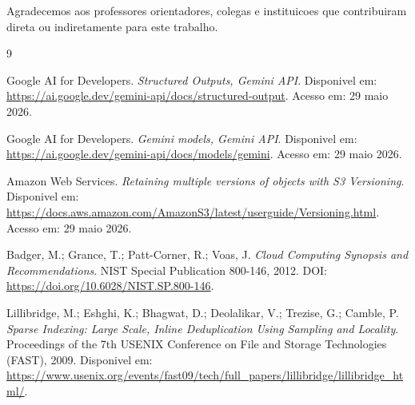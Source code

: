 \documentclass[12pt,a4paper]{article}
\begin{document}
Agradecemos aos professores orientadores, colegas e instituicoes que contribuiram direta ou indiretamente para este trabalho.

\begin{thebibliography}{9}

Google AI for Developers.
\textit{Structured Outputs, Gemini API}.
Disponivel em: \url{https://ai.google.dev/gemini-api/docs/structured-output}.
Acesso em: 29 maio 2026.

Google AI for Developers.
\textit{Gemini models, Gemini API}.
Disponivel em: \url{https://ai.google.dev/gemini-api/docs/models/gemini}.
Acesso em: 29 maio 2026.

Amazon Web Services.
\textit{Retaining multiple versions of objects with S3 Versioning}.
Disponivel em: \url{https://docs.aws.amazon.com/AmazonS3/latest/userguide/Versioning.html}.
Acesso em: 29 maio 2026.

Badger, M.; Grance, T.; Patt-Corner, R.; Voas, J.
\textit{Cloud Computing Synopsis and Recommendations}.
NIST Special Publication 800-146, 2012.
DOI: \url{https://doi.org/10.6028/NIST.SP.800-146}.

Lillibridge, M.; Eshghi, K.; Bhagwat, D.; Deolalikar, V.; Trezise, G.; Camble, P.
\textit{Sparse Indexing: Large Scale, Inline Deduplication Using Sampling and Locality}.
Proceedings of the 7th USENIX Conference on File and Storage Technologies (FAST), 2009.
Disponivel em: \url{https://www.usenix.org/events/fast09/tech/full_papers/lillibridge/lillibridge_html/}.

\end{thebibliography}
\end{document}
